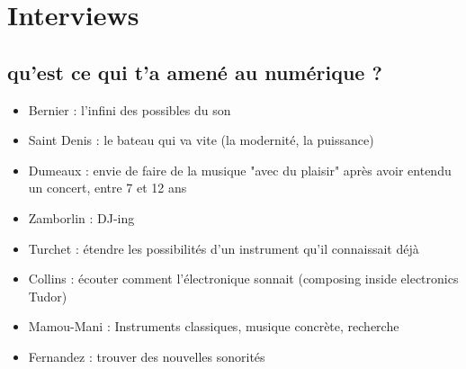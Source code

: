 \chapter{Interviews}
\label{appendix:interviews}

\section*{qu'est ce qui t'a amené au numérique ?}

\vspace{-1em}
\begin{itemize}[noitemsep]
\item Bernier : l'infini des possibles du son
\item Saint Denis : le bateau qui va vite (la modernité, la puissance)
\item Dumeaux : envie de faire de la musique "avec du plaisir" après avoir entendu un concert, entre 7 et 12 ans
\item Zamborlin : DJ-ing
\item Turchet : étendre les possibilités d'un instrument qu'il connaissait déjà
\item Collins : écouter comment l'électronique sonnait (composing inside electronics Tudor)
\item Mamou-Mani : Instruments classiques, musique concrète, recherche
\item Fernandez : trouver des nouvelles sonorités
\end{itemize}

